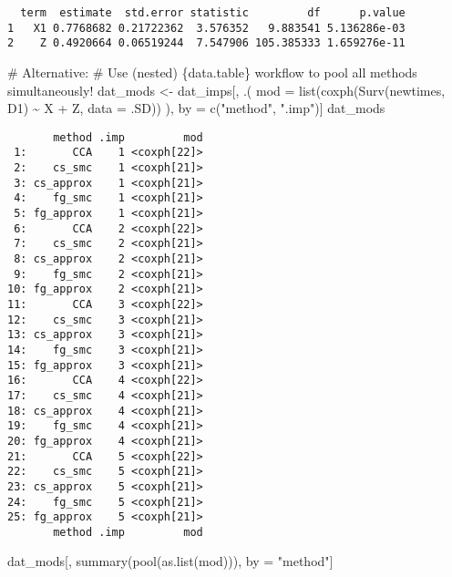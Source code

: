 \documentclass[
  12pt,
  a4paper,
]{article}
\newenvironment{Shaded}{\begin{snugshade}}{\end{snugshade}}
\newcommand{\AttributeTok}[1]{\textcolor[rgb]{0.40,0.45,0.13}{#1}}
\newcommand{\CommentTok}[1]{\textcolor[rgb]{0.37,0.37,0.37}{#1}}
\newcommand{\FunctionTok}[1]{\textcolor[rgb]{0.28,0.35,0.67}{#1}}
\newcommand{\NormalTok}[1]{\textcolor[rgb]{0.00,0.23,0.31}{#1}}
\newcommand{\OtherTok}[1]{\textcolor[rgb]{0.00,0.23,0.31}{#1}}
\newcommand{\SpecialCharTok}[1]{\textcolor[rgb]{0.37,0.37,0.37}{#1}}
\newcommand{\StringTok}[1]{\textcolor[rgb]{0.13,0.47,0.30}{#1}}
\begin{document}
\begin{verbatim}
  term  estimate  std.error statistic         df      p.value
1   X1 0.7768682 0.21722362  3.576352   9.883541 5.136286e-03
2    Z 0.4920664 0.06519244  7.547906 105.385333 1.659276e-11
\end{verbatim}

\begin{Shaded}
\begin{Highlighting}[]
\CommentTok{\# Alternative: }
\CommentTok{\# Use (nested) \{data.table\} workflow to pool all methods simultaneously!}
\NormalTok{dat\_mods }\OtherTok{\textless{}{-}}\NormalTok{ dat\_imps[, .(}
  \AttributeTok{mod =} \FunctionTok{list}\NormalTok{(}\FunctionTok{coxph}\NormalTok{(}\FunctionTok{Surv}\NormalTok{(newtimes, D1) }\SpecialCharTok{\textasciitilde{}}\NormalTok{ X }\SpecialCharTok{+}\NormalTok{ Z, }\AttributeTok{data =}\NormalTok{ .SD))}
\NormalTok{), by }\OtherTok{=} \FunctionTok{c}\NormalTok{(}\StringTok{"method"}\NormalTok{, }\StringTok{".imp"}\NormalTok{)]}
\NormalTok{dat\_mods}
\end{Highlighting}
\end{Shaded}

\begin{verbatim}
       method .imp         mod
 1:       CCA    1 <coxph[22]>
 2:    cs_smc    1 <coxph[21]>
 3: cs_approx    1 <coxph[21]>
 4:    fg_smc    1 <coxph[21]>
 5: fg_approx    1 <coxph[21]>
 6:       CCA    2 <coxph[22]>
 7:    cs_smc    2 <coxph[21]>
 8: cs_approx    2 <coxph[21]>
 9:    fg_smc    2 <coxph[21]>
10: fg_approx    2 <coxph[21]>
11:       CCA    3 <coxph[22]>
12:    cs_smc    3 <coxph[21]>
13: cs_approx    3 <coxph[21]>
14:    fg_smc    3 <coxph[21]>
15: fg_approx    3 <coxph[21]>
16:       CCA    4 <coxph[22]>
17:    cs_smc    4 <coxph[21]>
18: cs_approx    4 <coxph[21]>
19:    fg_smc    4 <coxph[21]>
20: fg_approx    4 <coxph[21]>
21:       CCA    5 <coxph[22]>
22:    cs_smc    5 <coxph[21]>
23: cs_approx    5 <coxph[21]>
24:    fg_smc    5 <coxph[21]>
25: fg_approx    5 <coxph[21]>
       method .imp         mod
\end{verbatim}

\begin{Shaded}
\begin{Highlighting}[]
\NormalTok{dat\_mods[, }\FunctionTok{summary}\NormalTok{(}\FunctionTok{pool}\NormalTok{(}\FunctionTok{as.list}\NormalTok{(mod))), by }\OtherTok{=} \StringTok{"method"}\NormalTok{]}
\end{Highlighting}
\end{Shaded}
\end{document}
